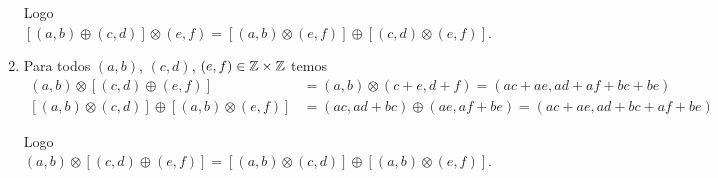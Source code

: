 \documentclass[12pt]{article}
\begin{document}
\begin{enumerate}
		Logo $[(a, b) \oplus (c, d)] \otimes (e, f) = [(a, b) \otimes (e, f)] \oplus [(c, d) \otimes (e, f)]$.

		\item Para todos $(a, b)$, $(c, d)$, $(e, f) \in \mathbb{Z} \times \mathbb{Z}$ temos
		\begin{align*}
			(a, b) \otimes [(c, d) \oplus (e, f)] &= (a, b) \otimes (c + e, d + f) = (ac + ae, ad + af + bc + be)\\
			[(a, b) \otimes (c, d)] \oplus [(a, b) \otimes (e, f)] &= (ac, ad + bc) \oplus (ae, af + be) = (ac + ae, ad + bc + af + be)
		\end{align*}

		Logo $(a, b) \otimes [(c, d) \oplus (e, f)] = [(a, b) \otimes (c, d)] \oplus [(a, b) \otimes (e, f)]$.
	\end{enumerate}
\end{document}
